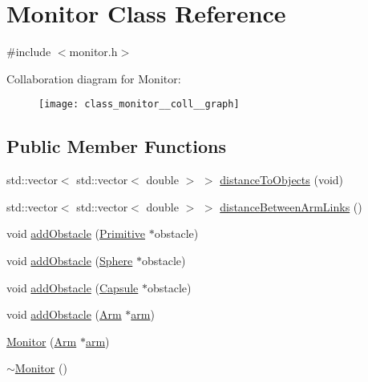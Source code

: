 \hypertarget{class_monitor}{}\section{Monitor Class Reference}
\label{class_monitor}


{\ttfamily \#include $<$monitor.\+h$>$}



Collaboration diagram for Monitor\+:\nopagebreak
\begin{figure}[H]
\begin{center}
\leavevmode
\texttt{[image: class\_monitor\_\_coll\_\_graph]}
\end{center}
\end{figure}
\subsection*{Public Member Functions}
\begin{DoxyCompactItemize}
\item 
std\+::vector$<$ std\+::vector$<$ double $>$ $>$ \hyperlink{class_monitor_afefe8eeab13fd3f8f3c59ae53d25a00e}{distance\+To\+Objects} (void)
\item 
std\+::vector$<$ std\+::vector$<$ double $>$ $>$ \hyperlink{class_monitor_afe72152adc0d2d2faf8fb01563417033}{distance\+Between\+Arm\+Links} ()
\item 
void \hyperlink{class_monitor_a8c448bcff703af93489cc4f0847d4245}{add\+Obstacle} (\hyperlink{class_primitive}{Primitive} $\ast$obstacle)
\item 
void \hyperlink{class_monitor_af5979d8f05c2d945ddc055e329fad5d2}{add\+Obstacle} (\hyperlink{class_sphere}{Sphere} $\ast$obstacle)
\item 
void \hyperlink{class_monitor_a192497730489ebcd6a6580875cfbeee3}{add\+Obstacle} (\hyperlink{class_capsule}{Capsule} $\ast$obstacle)
\item 
void \hyperlink{class_monitor_a580dedf3090ffff7a452dbe32cc585f4}{add\+Obstacle} (\hyperlink{class_arm}{Arm} $\ast$\hyperlink{class_monitor_a8b75571f6224f999a3dc05cf9a83fa68}{arm})
\item 
\hyperlink{class_monitor_adda7d547e1226e159836356dd8af14bb}{Monitor} (\hyperlink{class_arm}{Arm} $\ast$\hyperlink{class_monitor_a8b75571f6224f999a3dc05cf9a83fa68}{arm})
\item 
\hyperlink{class_monitor_a64aba8195effc068092ddea5a71e8176}{$\sim$\+Monitor} ()
\end{DoxyCompactItemize}
